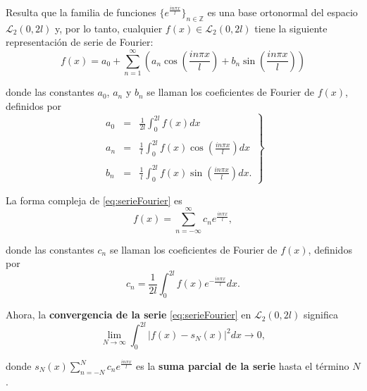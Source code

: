 \begin{multicols}{2}
Resulta que la familia de funciones $\{e^{\frac{in\pi x}{l}}\}_{n\in\mathbb{Z}}$ es una base ortonormal del espacio $\mathcal{L}_2(0, 2l)$ y, por lo tanto, cualquier $f(x) \in \mathcal{L}_2(0, 2l)$ tiene la siguiente representación de serie de Fourier:
\begin{equation}
f(x) = a_0 + \sum_{n=1}^{\infty} \left( a_n \cos\left(\frac{in\pi x}{l}\right) + b_n \sin\left(\frac{in\pi x}{l}\right) \right)
\label{eq:serieFourier}
\end{equation}

donde las constantes $a_0$, $a_n$ y $b_n$ se llaman los coeficientes de Fourier de $f(x)$, definidos por
\begin{equation}
    \left.
	\begin{array}{rcl}
	    a_0 &=&\displaystyle \frac{1}{2l} \int_0^{2l} f(x)dx\\\\
	    a_n &=&\displaystyle \frac{1}{l} \int_0^{2l} f(x)\cos\left(\frac{in\pi x}{l}\right)dx\\\\ 
	    b_n &=&\displaystyle \frac{1}{l} \int_0^{2l} f(x)\sin\left(\frac{in\pi x}{l}\right)dx.
	\end{array}
    \right\}
\end{equation}

La forma compleja de \ref{eq:serieFourier} es
\begin{equation}
    f(x) = \sum_{n=-\infty}^{\infty} c_n e^{\frac{in\pi x}{l}},
\end{equation}

donde las constantes $c_n$ se llaman los coeficientes de Fourier de $f(x)$, definidos por
\begin{equation}
    c_n = \frac{1}{2l} \int_0^{2l} f(x)e^{-\frac{in\pi x}{l}} dx.
\end{equation}

Ahora, la \textbf{convergencia de la serie} \ref{eq:serieFourier} en $\mathcal{L}_2(0, 2l)$ significa
$$\lim_{N\rightarrow\infty} \int_0^{2l} |f(x) - s_N(x)|^2 dx \rightarrow 0,$$

donde $s_N(x)\sum_{n=-N}^{N}c_ne^{\frac{in\pi x}{l}}$ es la \textbf{suma parcial de la serie} hasta el término $N$.


\end{multicols}
